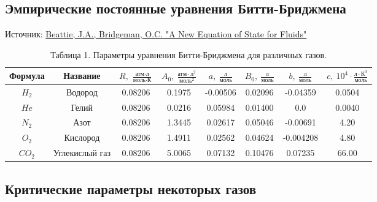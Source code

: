 \documentclass[a4paper]{article}
\numberwithin{equation}{subsection} %
\begin{document}
\subsection{Эмпирические постоянные уравнения Битти-Бриджмена}

Источник: \href{https://www.jstor.org/stable/20026205?searchText=Beattie\%2C+J.A.\%2C+Bridgeman\%2C+O.C.+\%22A+New+Equation+of+State+for+Fluids\%22&searchUri=\%2Faction\%2FdoBasicSearch\%3FQuery\%3DBeattie\%252C\%2BJ.A.\%252C\%2BBridgeman\%252C\%2BO.C.\%2B\%2522A\%2BNew\%2BEquation\%2Bof\%2BState\%2Bfor\%2BFluids\%2522\%26so\%3Drel&ab_segments=0\%2Fbasic_phrase_search\%2Fcontrol&refreqid=fastly-default\%3A3700c3db53f265ea23b574296ef458ee&seq=1}{Beattie, J.A., Bridgeman, O.C. "A New Equation of State for Fluids"}

\begin{table}[h!]
\centering
\begin{tabular}{|c|c|c|c|c|c|c|c|}
\hline
Формула & Название & $R, \ \frac{\text{атм} \cdot \text{л}}{\text{моль} \cdot \text{К}}$ & $A_0, \ \frac{\text{атм} \cdot \text{л}^2}{\text{моль}^2}$ & $a, \ \frac{\text{л}}{\text{моль}}$ & $B_0, \ \frac{\text{л}}{\text{моль}}$ & $b, \ \frac{\text{л}}{\text{моль}}$ & $c, \ 10^4 \cdot \frac{\text{л} \cdot \text{К}^3}{\text{моль}}$ \\
\hline
$H_2$ & Водород & 0.08206 & 0.1975 & -0.00506 & 0.02096 & -0.04359 & 0.0504 \\
$He$ & Гелий & 0.08206 & 0.0216 & 0.05984 & 0.01400 & 0.0 & 0.0040 \\
$N_2$ & Азот & 0.08206 & 1.3445 & 0.02617 & 0.05046 & -0.00691 & 4.20 \\
$O_2$ & Кислород & 0.08206 & 1.4911 & 0.02562 & 0.04624 & -0.004208 & 4.80 \\
$CO_2$ & Углекислый газ & 0.08206 & 5.0065 & 0.07132 & 0.10476 & 0.07235 & 66.00 \\
\hline
\end{tabular}
\caption{Таблица 1. Параметры уравнения Битти-Бриджмена для различных газов.}
\label{tab:BB_params}
\end{table}

\subsection{Критические параметры некоторых газов}
\end{document}
